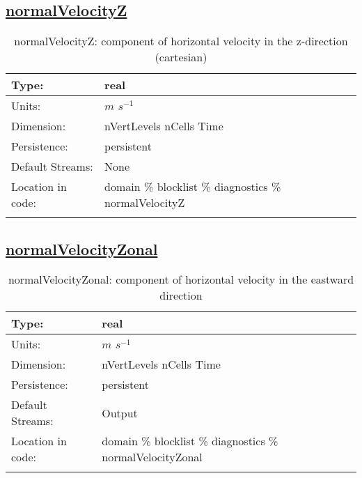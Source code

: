\subsection[normalVelocityZ]{\hyperref[sec:var_tab_diagnostics]{normalVelocityZ}}
\label{subsec:var_sec_diagnostics_normalVelocityZ}
\begin{center}
\begin{longtable}{| p{2.0in} | p{4.0in} |}
        \hline 
        Type: & real \\
        \hline 
        Units: & $m$ $s^{-1}$ \\
        \hline 
        Dimension: & nVertLevels nCells Time \\
        \hline 
        Persistence: & persistent \\
        \hline 
		 Default Streams: & None \\
        \hline 
		 Location in code: & domain \% blocklist \% diagnostics \% normalVelocityZ \\
		 \hline 
    \caption{normalVelocityZ: component of horizontal velocity in the z-direction (cartesian)}
\end{longtable}
\end{center}
\subsection[normalVelocityZonal]{\hyperref[sec:var_tab_diagnostics]{normalVelocityZonal}}
\label{subsec:var_sec_diagnostics_normalVelocityZonal}
\begin{center}
\begin{longtable}{| p{2.0in} | p{4.0in} |}
        \hline 
        Type: & real \\
        \hline 
        Units: & $m$ $s^{-1}$ \\
        \hline 
        Dimension: & nVertLevels nCells Time \\
        \hline 
        Persistence: & persistent \\
        \hline 
		 Default Streams: & Output  \\
        \hline 
		 Location in code: & domain \% blocklist \% diagnostics \% normalVelocityZonal \\
		 \hline 
    \caption{normalVelocityZonal: component of horizontal velocity in the eastward direction}
\end{longtable}
\end{center}
